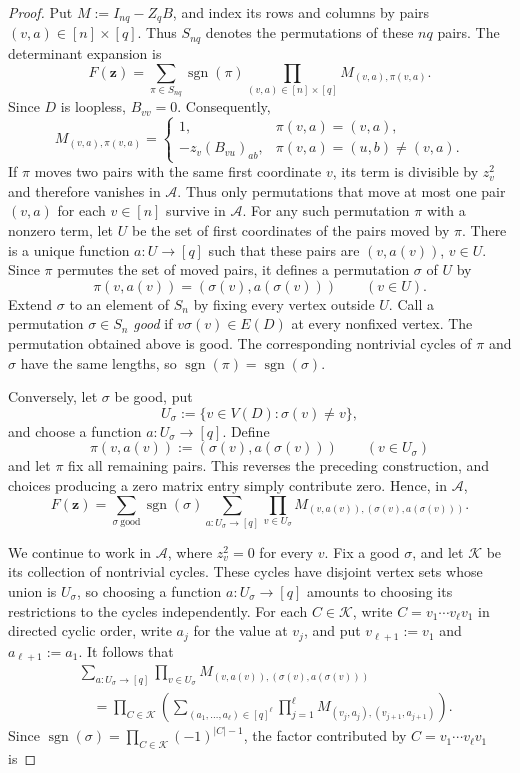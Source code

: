 \documentclass[11pt]{amsart}
\theoremstyle{remark}
\begin{document}
\begin{proof}
Put $M:=I_{nq}-Z_qB$, and index its rows and columns by pairs
$(v,a)\in[n]\times[q]$.  Thus $S_{nq}$ denotes the permutations of
these $nq$ pairs.  The determinant expansion is
\[
  F(\mathbf z)
  =
  \sum_{\pi\in S_{nq}}
  \operatorname{sgn}(\pi)
  \prod_{(v,a)\in[n]\times[q]}
  M_{(v,a),\pi(v,a)}.
\]
Since $D$ is loopless, $B_{vv}=0$.  Consequently,
\[
  M_{(v,a),\pi(v,a)}
  =
  \begin{cases}
    1,
      & \pi(v,a)=(v,a),\\[2mm]
    -z_v(B_{vu})_{ab},
      & \pi(v,a)=(u,b)\ne(v,a).
  \end{cases}
\]
If $\pi$ moves two pairs with the same first coordinate $v$, its
term is divisible by $z_v^2$ and therefore vanishes in $\mathcal A$.
Thus only permutations that move at most one pair $(v,a)$ for each
$v\in[n]$ survive in $\mathcal A$.  For any such permutation $\pi$ with a
nonzero term, let $U$ be the set of first coordinates of the pairs moved by
$\pi$.  There is a unique function $a\colon U\to[q]$ such that these pairs
are $(v,a(v))$, $v\in U$.  Since $\pi$ permutes the set of moved pairs, it
defines a permutation $\sigma$ of $U$ by
\[
  \pi(v,a(v))=(\sigma(v),a(\sigma(v)))
  \qquad(v\in U).
\]
Extend $\sigma$ to an element of $S_n$ by fixing every vertex outside $U$.
Call a permutation $\sigma\in S_n$ \emph{good} if
$v\sigma(v)\in E(D)$ at every nonfixed vertex.  The permutation obtained
above is good.
The corresponding nontrivial cycles of $\pi$ and $\sigma$ have the same
lengths, so
$\operatorname{sgn}(\pi)=\operatorname{sgn}(\sigma)$.

Conversely, let $\sigma$ be good, put
\[
  U_\sigma:=\{v\in V(D):\sigma(v)\ne v\},
\]
and choose a function $a\colon U_\sigma\to[q]$.  Define
\[
  \pi(v,a(v)):=(\sigma(v),a(\sigma(v)))
  \qquad(v\in U_\sigma)
\]
and let $\pi$ fix all remaining pairs.  This reverses the preceding
construction, and choices producing a zero matrix entry simply
contribute zero.  Hence, in $\mathcal A$,
\[
  F(\mathbf z)
  =
  \sum_{\sigma\ \mathrm{good}}
  \operatorname{sgn}(\sigma)
  \sum_{a\colon U_\sigma\to[q]}
  \prod_{v\in U_\sigma}
  M_{(v,a(v)),(\sigma(v),a(\sigma(v)))}.
\]

We continue to work in $\mathcal A$, where $z_v^2=0$ for every $v$.
Fix a good $\sigma$, and let $\mathcal K$ be its collection of
nontrivial cycles.  These cycles have disjoint vertex sets whose union is
$U_\sigma$, so choosing a function $a\colon U_\sigma\to[q]$ amounts to
choosing its restrictions to the cycles independently.  For each
$C\in\mathcal K$, write $C=v_1\cdots v_\ell v_1$ in directed cyclic order,
write $a_j$ for the value at $v_j$, and put $v_{\ell+1}:=v_1$ and
$a_{\ell+1}:=a_1$.  It follows that
\[
\begin{aligned}
  &\sum_{a\colon U_\sigma\to[q]}
  \prod_{v\in U_\sigma}
  M_{(v,a(v)),(\sigma(v),a(\sigma(v)))}\\
  &\quad=
  \prod_{C\in\mathcal K}
  \left(
    \sum_{(a_1,\ldots,a_\ell)\in[q]^\ell}
    \prod_{j=1}^{\ell}
    M_{(v_j,a_j),(v_{j+1},a_{j+1})}
  \right).
\end{aligned}
\]
Since $\operatorname{sgn}(\sigma)=\prod_{C\in\mathcal K}(-1)^{|C|-1}$, the
factor contributed by $C=v_1\cdots v_\ell v_1$ is


\end{proof}
\end{document}
